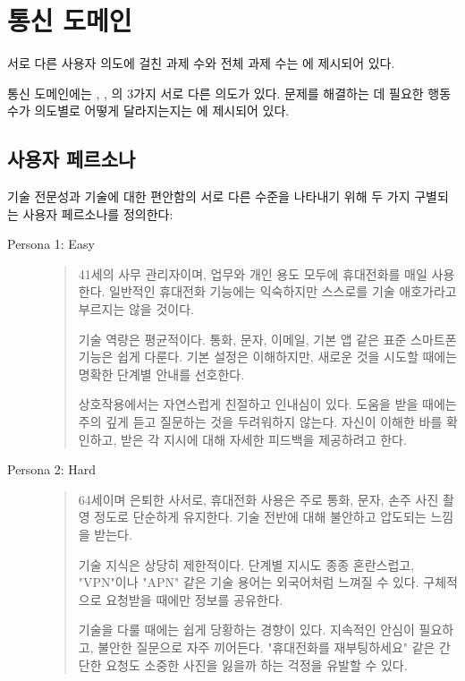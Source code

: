 \section{통신 도메인}
\label{app:telecom}

서로 다른 사용자 의도에 걸친 과제 수와 전체 과제 수는 에 제시되어 있다.




통신 도메인에는 \serviceissue, \mobiledataissue, \mmsissue 의 3가지 서로 다른 의도가 있다.
문제를 해결하는 데 필요한 행동 수가 의도별로 어떻게 달라지는지는 에 제시되어 있다.



\subsection{사용자 페르소나}
\label{app:telecom-user-persona}

기술 전문성과 기술에 대한 편안함의 서로 다른 수준을 나타내기 위해 두 가지 구별되는 사용자 페르소나를 정의한다:

\begin{description}
\item[Persona 1: Easy] 
\begin{quote}
41세의 사무 관리자이며, 업무와 개인 용도 모두에 휴대전화를 매일 사용한다. 일반적인 휴대전화 기능에는 익숙하지만 스스로를 기술 애호가라고 부르지는 않을 것이다.

기술 역량은 평균적이다. 통화, 문자, 이메일, 기본 앱 같은 표준 스마트폰 기능은 쉽게 다룬다. 기본 설정은 이해하지만, 새로운 것을 시도할 때에는 명확한 단계별 안내를 선호한다.

상호작용에서는 자연스럽게 친절하고 인내심이 있다. 도움을 받을 때에는 주의 깊게 듣고 질문하는 것을 두려워하지 않는다. 자신이 이해한 바를 확인하고, 받은 각 지시에 대해 자세한 피드백을 제공하려고 한다.
\end{quote}

\item[Persona 2: Hard]
\begin{quote}
64세이며 은퇴한 사서로, 휴대전화 사용은 주로 통화, 문자, 손주 사진 촬영 정도로 단순하게 유지한다. 기술 전반에 대해 불안하고 압도되는 느낌을 받는다.

기술 지식은 상당히 제한적이다. 단계별 지시도 종종 혼란스럽고, "VPN"이나 "APN" 같은 기술 용어는 외국어처럼 느껴질 수 있다. 구체적으로 요청받을 때에만 정보를 공유한다.

기술을 다룰 때에는 쉽게 당황하는 경향이 있다. 지속적인 안심이 필요하고, 불안한 질문으로 자주 끼어든다. "휴대전화를 재부팅하세요" 같은 간단한 요청도 소중한 사진을 잃을까 하는 걱정을 유발할 수 있다.
\end{quote}
\end{description}

